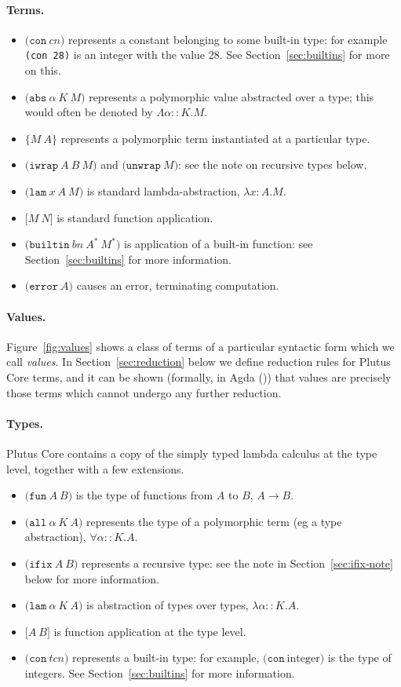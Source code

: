\documentclass[a4paper]{article}
\newcommand{\keyword}[1]{\texttt{#1}}
\newcommand{\construct}[1]{\texttt{(} #1 \texttt{)}}
\newcommand{\con}[1]{\construct{\keyword{con} ~ #1}}
\newcommand{\abs}[3]{\construct{\keyword{abs} ~ #1 ~ #2 ~ #3}}
\newcommand{\inst}[2]{\texttt{\{}#1 ~ #2\texttt{\}}}
\newcommand{\lam}[3]{\construct{\keyword{lam} ~ #1 ~ #2 ~ #3}}
\newcommand{\app}[2]{\texttt{[} #1 ~ #2 \texttt{]}}
\newcommand{\iwrap}[3]{\construct{\keyword{iwrap} ~ #1 ~ #2 ~ #3}}
\newcommand{\unwrap}[1]{\construct{\keyword{unwrap} ~ #1}}
\newcommand{\builtin}[3]{\construct{\keyword{builtin} ~ #1 ~ #2 ~ #3}}
\newcommand{\error}[1]{\construct{\keyword{error} ~ #1}}
\newcommand{\funT}[2]{\construct{\keyword{fun} ~ #1 ~ #2}}
\newcommand{\ifixT}[2]{\construct{\keyword{ifix} ~ #1 ~ #2}}
\newcommand{\fixT}{\ifixT}
\newcommand{\allT}[3]{\construct{\keyword{all} ~ #1 ~ #2 ~ #3}}
\newcommand{\conT}[1]{\construct{\keyword{con} ~ #1}}
\newcommand{\lamT}[3]{\construct{\keyword{lam} ~ #1 ~ #2 ~ #3}}
\newcommand{\appT}[2]{\texttt{[} #1 ~ #2 \texttt{]}}
\begin{document}
\paragraph{Terms.}
\begin{itemize}
\item $\con{cn}$ represents a constant belonging to some built-in
  type: for example \texttt{(con 28)} is an integer with the value 28.
  See Section~\ref{sec:builtins} for more on this.
\item $\abs{\alpha}{K}{M}$ represents a polymorphic value abstracted
  over a type; this would often be denoted by $\Lambda\alpha{::}K.M$.
\item $\inst{M}{A}$ represents a polymorphic term instantiated at a particular type.
\item $\iwrap{A}{B}{M}$ and $\unwrap{M}$: see the note on recursive types below.
\item $\lam{x}{A}{M}$ is standard lambda-abstraction, $\lambda{}x{:}{A}.{M}$.
\item $\app{M}{N}$ is standard function application.
\item $\builtin{bn}{A^*}{M^*}$ is application of a built-in function: see Section~\ref{sec:builtins} for more information.
\item $\error{A}$ causes an error, terminating computation.
\end{itemize}

\paragraph{Values.} Figure~\ref{fig:values} shows a class of terms of a particular
syntactic form which we call \textit{values}.  In
Section~\ref{sec:reduction} below we define reduction rules for Plutus
Core terms, and it can be shown (formally, in
Agda (\cite{Plutus-metatheory-repo})) that values are precisely those
terms which cannot undergo any further reduction.

\paragraph{Types.} Plutus Core contains a copy of the simply typed lambda calculus
  at the type level, together with a few extensions.
\begin{itemize}
\item $\funT{A}{B}$ is the type of functions from $A$ to $B$, $A \rightarrow B$.
\item $\allT{\alpha}{K}{A}$ represents the type of a polymorphic term (eg a type abstraction), $\forall \alpha{::}K.A$.
\item $\fixT{A}{B}$ represents a recursive type: see the note in Section~\ref{sec:ifix-note} below for more information.
\item $\lamT{\alpha}{K}{A}$ is abstraction of types over types, $\lambda \alpha{::}K.A$.
\item $\appT{A}{B}$ is function application at the type level.
\item $\conT{tcn}$ represents a built-in type: for example, $\conT{\textrm{integer}}$
is the type of integers.  See Section~\ref{sec:builtins} for more information.
\end{itemize}
\end{document}
